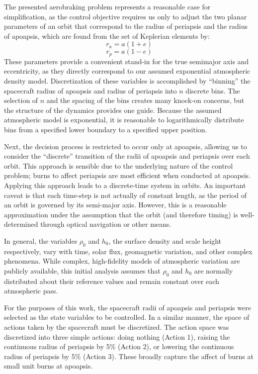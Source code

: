 \documentclass[paper,11pt]{AAS}		%
\begin{document}
The presented aerobraking problem represents a reasonable case for simplification, as the control objective requires us only to adjust the two planar parameters of an orbit that correspond to the radius of periapsis and the radius of apoapsis, which are found from the set of Keplerian elements by:
\begin{equation}
r_a = a (1+e)
\end{equation}
\begin{equation}
r_p = a (1-e)
\end{equation}
These parameters provide a convenient stand-in for the true semimajor axis and eccentricity, as they directly correspond to our assumed exponential atmospheric density model. Discretization of these variables is accomplished by ``binning'' the spacecraft radius of apoapsis and radius of periapsis into $n$ discrete bins. The selection of $n$ and the spacing of the bins creates many knock-on concerns, but the structure of the dynamics provides one guide. Because the assumed atmospheric model is exponential, it is reasonable to logarithmically distribute bins from a specified lower boundary to a specified upper position.

Next, the decision process is restricted to occur only at apoapsis, allowing us to consider the ``discrete'' transition of the radii of apoapsis and periapsis over each orbit. This approach is sensible due to the underlying 
nature of the control problem; burns to affect periapsis are most efficient when conducted at apoapsis. Applying this approach 
leads to a discrete-time system in orbits. An important caveat is that each time-step is not actually of constant length, as 
the period of an orbit is governed by its semi-major axis. However, this is a reasonable approximation under the assumption 
that the orbit (and therefore timing) is well-determined 
through optical navigation or other means.

In general, the variables $\rho_0$ and $h_0$, the surface density and scale height respectively, vary with time, solar flux, 
geomagnetic variation, and other complex phenomena. While complex, high-fidelity models of atmospheric variation are publicly 
available, this initial analysis assumes that $\rho_0$ and $h_0$ are normally distributed about their reference values and 
remain constant over each atmospheric pass.

For the purposes of this work, the spacecraft radii of apoapsis and periapsis 
were selected as the state variables to be controlled. In a similar manner, the space of actions taken by the spacecraft 
must be discretized.
The action space was discretized into three simple actions: 
doing nothing (Action 1), raising the continuous radius of periapsis by 5\% (Action 2), or lowering the continuous radius of periapsis by 5\% (Action 3). These broadly capture the affect of burns at small unit burns at apoapsis. 
\end{document}
